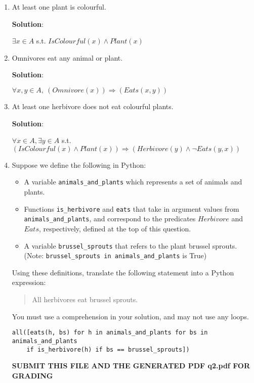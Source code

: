 \documentclass{article}
\begin{document}
\begin{enumerate}
\item
At least one plant is colourful.

\textbf{Solution}:

$\exists x \in A $ s.t. $IsColourful(x) \land Plant(x)$

\item
Omnivores eat any animal or plant.

\textbf{Solution}:

$\forall x, y \in A, ~(Omnivore(x)) \Rightarrow (Eats(x, y))$

\item
At least one herbivore does not eat colourful plants.

\textbf{Solution}:

$\forall x \in A, \exists y \in A $ s.t. $ (IsColourful(x) \land Plant(x)) \Rightarrow (Herbivore(y) \land \neg Eats(y, x))$

\item
Suppose we define the following in Python:
\begin{itemize}
    \item A variable \texttt{animals\_and\_plants} which represents a set of animals and plants.
    \item Functions \texttt{is\_herbivore} and \texttt{eats} that take in argument values from \texttt{animals\_and\_plants}, and correspond to the predicates $Herbivore$ and $Eats$, respectively, defined at the top of this question.
    \item A variable \texttt{brussel\_sprouts} that refers to the plant brussel sprouts. (Note: \texttt{brussel\_sprouts in animals\_and\_plants}  is True)
\end{itemize}

Using these definitions, translate the following statement into a Python expression:
\begin{quote}
All herbivores eat brussel sprouts.
\end{quote}

You must use a comprehension in your solution, and may not use any loops.

\begin{verbatim}
all([eats(h, bs) for h in animals_and_plants for bs in animals_and_plants
    if is_herbivore(h) if bs == brussel_sprouts])

\end{verbatim}

\begin{center}
    \textbf{SUBMIT THIS FILE AND THE GENERATED PDF q2.pdf FOR GRADING}
\end{center}
\end{enumerate}
\end{document}
